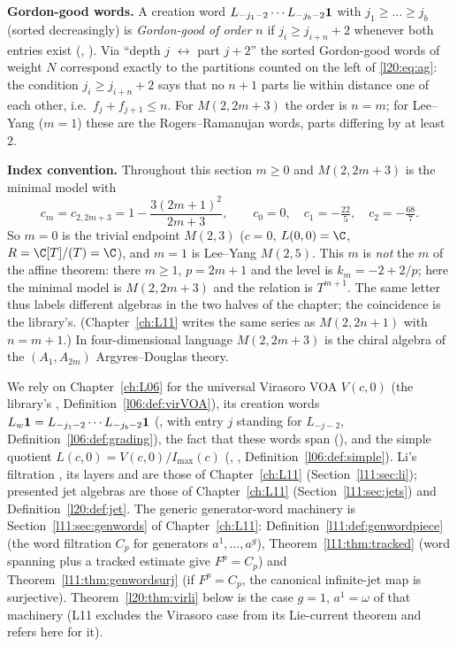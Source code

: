 \textbf{Gordon-good words.} A creation word $L_{-j_1-2}\cdots L_{-j_b-2}\mathbf{1}$ with $j_1\ge\dots\ge j_b$ (sorted
decreasingly) is \emph{Gordon-good of order $n$} if $j_i\ge j_{i+n}+2$ whenever both entries exist (,
). Via ``depth $j$ $\leftrightarrow$ part $j+2$'' the
sorted Gordon-good words of weight $N$ correspond exactly to the partitions counted on the left of \eqref{l20:eq:ag}: the
condition $j_i\ge j_{i+n}+2$ says that no $n+1$ parts lie within distance one of each other, i.e.\ $f_j+f_{j+1}\le n$. For
$M(2,2m+3)$ the order is $n=m$; for Lee--Yang ($m=1$) these are the Rogers--Ramanujan words, parts differing by at least $2$.

\textbf{Index convention.} Throughout this section $m\ge0$ and $M(2,2m+3)$ is the minimal model with
\begin{equation*}
c_m=c_{2,2m+3}=1-\frac{3(2m+1)^2}{2m+3},\qquad c_0=0,\quad c_1=-\tfrac{22}{5},\quad c_2=-\tfrac{68}{7}.
\end{equation*}
So $m=0$ is the trivial endpoint $M(2,3)$ ($c=0$, $L(0,0)=\C$, $R=\C[T]/(T)=\C$), and $m=1$ is Lee--Yang
$M(2,5)$. This $m$ is \emph{not} the $m$ of the affine theorem: there $m\ge1$, $p=2m+1$ and the level is
$k_m=-2+2/p$; here the minimal model is $M(2,2m+3)$ and the relation is $T^{m+1}$. The same letter thus labels different
algebras in the two halves of the chapter; the coincidence is the library's. (Chapter~\ref{ch:L11} writes the same series as
$M(2,2n+1)$ with $n=m+1$.) In four-dimensional language $M(2,2m+3)$ is the chiral algebra of the $(A_1,A_{2m})$
Argyres--Douglas theory.

We rely on Chapter~\ref{ch:L06} for the universal Virasoro VOA $V(c,0)$ (the library's ,
Definition~\ref{l06:def:virVOA}), its creation words $L_w\mathbf{1}=L_{-j_1-2}\cdots L_{-j_b-2}\mathbf{1}$
(, with entry $j$ standing for $L_{-j-2}$, Definition~\ref{l06:def:grading}), the fact that these
words span (), and the simple quotient $L(c,0)=V(c,0)/I_{\max}(c)$ (,
, Definition~\ref{l06:def:simple}). Li's filtration , its layers and
 are those of Chapter~\ref{ch:L11} (Section~\ref{l11:sec:li}); presented jet algebras are
those of Chapter~\ref{ch:L11} (Section~\ref{l11:sec:jets}) and Definition~\ref{l20:def:jet}. The generic
generator-word machinery is Section~\ref{l11:sec:genwords} of Chapter~\ref{ch:L11}: Definition~\ref{l11:def:genwordpiece}
(the word filtration $C_p$ for generators $a^1,\dots,a^g$), Theorem~\ref{l11:thm:tracked} (word spanning plus a tracked
estimate give $F^p=C_p$) and Theorem~\ref{l11:thm:genwordsurj} (if $F^p=C_p$, the canonical infinite-jet map is surjective).
Theorem~\ref{l20:thm:virli} below is the case $g=1$, $a^1=\omega$ of that machinery (L11 excludes the Virasoro case from its
Lie-current theorem and refers here for it).

